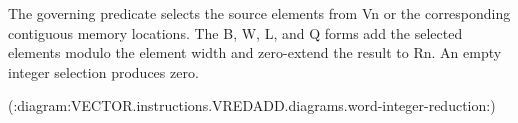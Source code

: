 The governing predicate selects the source elements from Vn or the
corresponding contiguous memory locations. The B, W, L, and Q forms add the
selected elements modulo the element width and zero-extend the result to Rn.
An empty integer selection produces zero.

(:diagram:VECTOR.instructions.VREDADD.diagrams.word-integer-reduction:)
